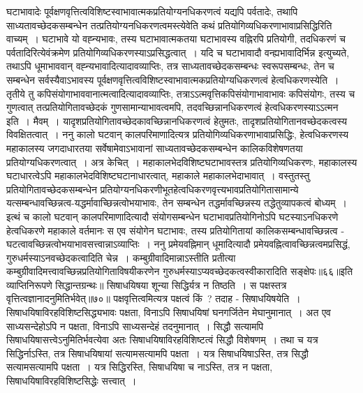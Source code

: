 घटाभावादेः पूर्वक्षणवृत्तित्वविशिष्टस्वाभावात्मकप्रतियोग्यनधिकरणत्वं यद्यपि पर्वतादेः, तथापि साध्यतावच्छेदकसम्बन्धेन तत्प्रतियोग्यनधिकरणत्वमस्त्येवेति कथं
प्रतियोगिव्यधिकरणाभावाप्रसिद्धिरिति वाच्यम्~। घटाभावे यो वह्न्यभावः, तस्य घटाभावात्मकतया घटाभावस्य वह्निरपि प्रतियोगी, तदधिकरणं च पर्वतादिरित्येवंक्रमेण
प्रतियोगिव्यधिकरणस्याऽप्रसिद्धत्वात्~। यदि च घटाभावादौ वन्ह्यभावादिर्भिन्न इत्युच्यते, तथाऽपि धूमाभाववान् वह्न्यभावादित्यादावव्याप्तिः, तत्र साध्यतावच्छेदकसम्बन्धः
स्वरूपसम्बन्धः, तेन च सम्बन्धेन सर्वस्यैवाऽभावस्य पूर्वक्षणवृत्तित्वविशिष्टस्वाभावात्मकप्रतियोग्यधिकरणत्वं हेत्वधिकरणस्येति~।
तृतीये तु कपिसंयोगाभाववानात्मत्वादित्यादावव्याप्तिः, तत्राऽऽत्मवृत्तिकपिसंयोगाभावाभावः कपिसंयोगः, तस्य च गुणत्वात् तत्प्रतियोगितावच्छेदकं
गुणसामान्याभावत्वमपि, तदवच्छिन्नानधिकरणत्वं हेत्वधिकरणस्याऽऽत्मन इति~।
मैवम्~। यादृशप्रतियोगितावच्छेदकावच्छिन्नानधिकरणत्वं हेतुमतः, तादृशप्रतियोगितानवच्छेदकत्वस्य विवक्षितत्वात्~।
ननु कालो घटवान् कालपरिमाणादित्यत्र प्रतियोगिव्यधिकरणाभावाप्रसिद्धिः, हेत्वधिकरणस्य महाकालस्य जगदाधारतया सर्वेषामेवाऽभावानां साध्यतावच्छेदकसम्बन्धेन
कालिकविशेषणतया प्रतियोग्यधिकरणत्वात्~।
अत्र केचित्~। महाकालभेदविशिष्टघटाभावस्तत्र प्रतियोगिव्यधिकरणः, महाकालस्य घटाधारत्वेऽपि महाकालभेदविशिष्टघटानाधारत्वात्, महाकाले महाकालभेदाभावात्~।
वस्तुतस्तु प्रतियोगितावच्छेदकसम्बन्धेन प्रतियोग्यनधिकरणीभूतहेत्वधिकरणवृत्त्यभावप्रतियोगितासामान्ये यत्सम्बन्धावच्छिन्नत्व-यद्धर्मावाच्छिन्नत्वोभयाभावः, तेन
सम्बन्धेन तद्धर्मावच्छिन्नस्य तद्धेतुव्यापकत्वं बोध्यम्~। इत्थं च कालो घटवान् कालपरिमाणादित्यादौ संयोगसम्बन्धेन घटाभावप्रतियोगिनोऽपि घटस्याऽनधिकरणे
हेत्वधिकरणे महाकाले वर्तमानः स एव संयोगेन घटाभावः, तस्य प्रतियोगितायां कालिकसम्बन्धावच्छिन्नत्व - घटत्वावच्छिन्नत्वोभयाभावसत्त्वान्नाऽव्याप्तिः~।
ननु प्रमेयवह्निमान् धूमादित्यादौ प्रमेयवह्नित्वावच्छिन्नत्वमप्रसिद्धं, गुरुधर्मस्याऽनवच्छेदकत्वादिति चेन्न~। कम्बुग्रीवादिमान्नाऽस्तीति प्रतीत्या
कम्बुग्रीवादिमत्त्वावच्छिन्नप्रतियोगिताविषयीकरणेन गुरुधर्मस्याऽप्यवच्छेदकत्वस्वीकारादिति सङ्क्षेपः॥६६॥इति व्याप्तिनिरूपणे सिद्धान्तग्रन्थः॥
सिषाधयिषया शून्या सिद्धिर्यत्र न तिष्ठति~।
स पक्षस्तत्र वृत्तित्वज्ञानादनुमितिर्भवेत्॥७०॥
पक्षवृत्तित्वमित्यत्र पक्षत्वं किं~? तदाह - सिषाधयिषयेति~।
सिषाधयिषाविरहविशिष्टसिद्ध्यभावः पक्षता, विनाऽपि सिषाधयिषां घनगर्जितेन मेघानुमानात्~। अत एव साध्यसन्देहोऽपि न पक्षता, विनाऽपि साध्यसन्देहं
तदनुमानात्~। सिद्धौ सत्यामपि सिषाधयिषासत्त्वेऽनुमितिर्भवत्येवा अतः सिषाधयिषाविरहविशिष्टत्वं सिद्धौ विशेषणम्~। तथा च यत्र सिद्धिर्नाऽस्ति, तत्र सिषाधयिषायां
सत्यामसत्यामपि पक्षता~। यत्र सिषाधयिषाऽस्ति, तत्र सिद्धौ सत्यामसत्यामपि पक्षता~। यत्र सिद्धिरस्ति, सिषाधयिषा च नाऽस्ति, तत्र न पक्षता, सिषाधयिषाविरहविशिष्टसिद्धेः
सत्त्वात्~।
